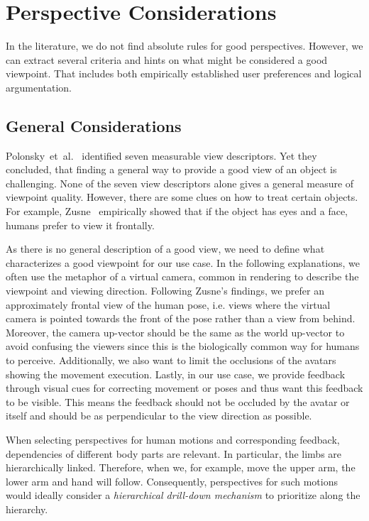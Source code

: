 \section{Perspective Considerations \label{sec:considerations}}
In the literature, we do not find absolute rules for good perspectives. However, we can extract several criteria and hints on what might be considered a good viewpoint. That includes both empirically established user preferences and logical argumentation.

\subsection{General Considerations}
Polonsky~et~al.~\cite{polonsky2005wii} identified seven measurable view descriptors. Yet they concluded, that finding a general way to provide a good view of an object is challenging. None of the seven view descriptors alone gives a general measure of viewpoint quality. However, there are some clues on how to treat certain objects. For example, Zusne~\cite{zusne1970vpf} empirically showed that if the object has eyes and a face, humans prefer to view it frontally.

As there is no general description of a good view, we need to define what characterizes a good viewpoint for our use case. In the following explanations, we often use the metaphor of a virtual camera, common in rendering to describe the viewpoint and viewing direction. Following Zusne's \cite{zusne1970vpf} findings, we prefer an approximately frontal view of the human pose, i.e. views where the virtual camera is pointed towards the front of the pose rather than a view from behind. Moreover, the camera up-vector should be the same as the world up-vector to avoid confusing the viewers since this is the biologically common way for humans to perceive. Additionally, we also want to limit the occlusions of the avatars showing the movement execution. Lastly, in our use case, we provide feedback through visual cues for correcting movement or poses and thus want this feedback to be visible. This means the feedback should not be occluded by the avatar or itself and should be as perpendicular to the view direction as possible.

When selecting perspectives for human motions and corresponding feedback, dependencies of different body parts are relevant. In particular, the limbs are hierarchically linked. Therefore, when we, for example, move the upper arm, the lower arm and hand will follow. Consequently, perspectives for such motions would ideally consider a \emph{hierarchical drill-down mechanism} to prioritize along the hierarchy.

